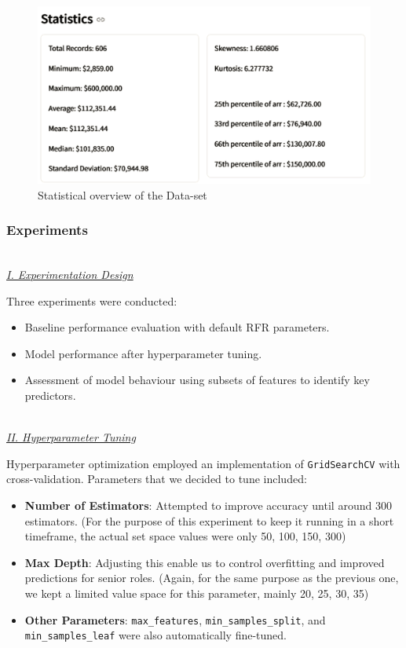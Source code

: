\documentclass[11pt,a4paper]{article}
\newcommand{\subsubsubsection}[1]{
  {\setlength\itemindent{13pt} \textit{\uline{\\#1\\}}} 
}
\begin{document}
\begin{figure}
    \centering
    \includegraphics[width=1\linewidth]{ICS-5110_website_stats.png}
    \caption{Statistical overview of the Data-set}
    \label{fig:Statistical overview of the Data-set}
\end{figure}

\subsubsection{Experiments}
\subsubsubsection{I. Experimentation Design}
Three experiments were conducted:
\begin{itemize}
\item Baseline performance evaluation with default RFR parameters.
\item Model performance after hyperparameter tuning.
\item Assessment of model behaviour using subsets of features to identify key predictors.
\end{itemize}

\subsubsubsection{II. Hyperparameter Tuning}
Hyperparameter optimization employed an implementation of \texttt{GridSearchCV} with cross-validation. Parameters that we decided to tune included:
\begin{itemize}
\item \textbf{Number of Estimators}: Attempted to improve accuracy until around 300 estimators. (For the purpose of this experiment to keep it running in a short timeframe, the actual set space values were only 50, 100, 150, 300)
\item \textbf{Max Depth}: Adjusting this enable us to control overfitting and improved predictions for senior roles. (Again, for the same purpose as the previous one, we kept a limited value space for this parameter, mainly 20, 25, 30, 35)
\item \textbf{Other Parameters}: \texttt{max\_features}, \texttt{min\_samples\_split}, and \texttt{min\_samples\_leaf} were also automatically fine-tuned.
\end{itemize}
\end{document}
